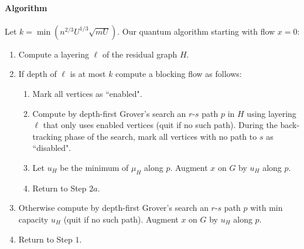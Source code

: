 \paragraph{Algorithm}
Let $k = \min(n^{2/3}U^{1/3}\sqrt{mU})$. Our quantum algorithm starting with flow $x=0$:
\begin{enumerate}
\item Compute a layering $\ell$ of the residual graph $H$.
\item If depth of $\ell$ is at most $k$ compute a blocking flow as follows:
	\begin{enumerate}
	\item Mark all vertices as ``enabled".
	\item Compute by depth-first Grover's search an $r$-$s$ path $p$ in $H$ using layering $\ell$ that only uses enabled vertices (quit if no such path). During the back-tracking phase of the search, mark all vertices with no path to $s$ as ``disabled".
	\item Let $u_H$ be the minimum of $\mu_H$ along $p$. Augment $x$ on $G$ by $u_H$ along $p$.
	\item Return to Step $2a$.
	\end{enumerate}
\item Otherwise compute by depth-first Grover's search an $r$-$s$ path $p$ with min capacity $u_H$ (quit if no such path). Augment $x$ on $G$ by $u_H$ along $p$.
\item Return to Step $1$.
\end{enumerate}
